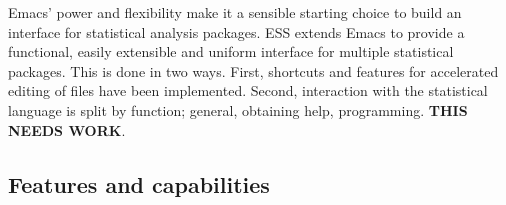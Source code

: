 \documentclass{article}
\newcommand{\stexttt}[1]{{\small\texttt{#1}}}
\begin{document}
Emacs' power and flexibility make it a sensible starting choice to
build an interface for statistical analysis packages.  ESS extends
Emacs to provide a functional, easily extensible and uniform interface
for multiple statistical packages.  This is done in two ways.  First,
shortcuts and features for accelerated editing of files have been
implemented.  Second, interaction with the statistical
language is split by function; general, obtaining help, programming.
\textbf{THIS NEEDS WORK}.







\subsection{Features and capabilities}
\label{sec:ESS:features}
\end{document}
